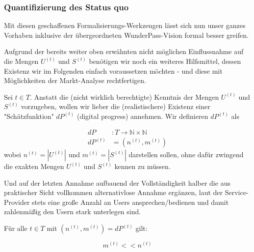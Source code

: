 \subsubsection{Quantifizierung des Status quo}
\label{sec:eco_zahlen_status_quo}

Mit diesen geschaffenen Formalisierungs-Werkzeugen lässt sich nun unser ganzes Vorhaben inklusive der übergeordneten WunderPass-Vision formal besser greifen.

\vspace{0.3cm}

Aufgrund der bereits weiter oben erwähnten nicht möglichen Einflussnahme auf die Mengen $U^{(t)}$ und $S^{(t)}$ benötigen wir noch ein weiteres Hilfsmittel, dessen Existenz wir im Folgenden einfach voraussetzen möchten - und diese mit Möglichkeiten der Markt-Analyse rechtfertigen.

\vspace{0.3cm}

\begin{Assumption}\label{assumptionOrakel}

Sei $t \in T$. Anstatt die (nicht wirklich berechtigte) Kenntnis der Mengen $U^{(t)}$ und $S^{(t)}$ vorzugeben, wollen wir lieber die (realistischere) Existenz einer "Schätzfunktion" $dP^{(t)}$ (digital progress) annehmen. Wir definieren $dP^{(t)}$ als

\vspace{0.3cm}

\begin{align*}
dP &: T \rightarrow \mathbb{N} \times \mathbb{N}  \\
dP^{(t)} &= (n^{(t)}, m^{(t)})
\end{align*}
wobei $n^{(t)} = |U^{(t)}|$ und $m^{(t)} = |S^{(t)}|$ darstellen sollen, ohne dafür zwingend die exakten Mengen $U^{(t)}$ und $S^{(t)}$ kennen zu müssen.

\end{Assumption}

\vspace{0.3cm}

Und auf der letzten Annahme aufbauend der Vollständigkeit halber die aus praktischer Sicht vollkommen alternativlose Annahme ergänzen, laut der Service-Provider stets eine große Anzahl an Users ansprechen/bedienen und damit zahlenmäßig den Usern stark unterlegen sind.
\vspace{0.3cm}

\begin{Assumption}\label{assumptionRatio}
Für alle $t \in T$ mit $(n^{(t)}, m^{(t)}) = dP^{(t)}$ gilt:

\begin{equation*}
m^{(t)} << n^{(t)}
\end{equation*}

\end{Assumption}

